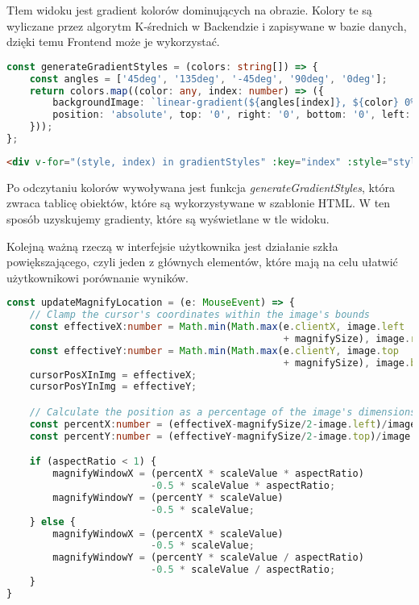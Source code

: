 Tłem widoku jest gradient kolorów dominujących na obrazie. Kolory te są wyliczane przez algorytm K-średnich w Backendzie i zapisywane w bazie danych, dzięki temu Frontend może je wykorzystać. 

\begin{lstlisting}[language=TypeScript, caption=Wyznaczanie gradientów z kolorów dominujących., label={lst:colors}]
const generateGradientStyles = (colors: string[]) => {
    const angles = ['45deg', '135deg', '-45deg', '90deg', '0deg'];
    return colors.map((color: any, index: number) => ({
        backgroundImage: `linear-gradient(${angles[index]}, ${color} 0%, transparent 100%)`,
        position: 'absolute', top: '0', right: '0', bottom: '0', left: '0',
    }));
};
\end{lstlisting}

\begin{lstlisting}[language=HTML, caption=Rysowanie kolorów dominujących (HTML).]
<div v-for="(style, index) in gradientStyles" :key="index" :style="style"/>
\end{lstlisting}

Po odczytaniu kolorów wywoływana jest funkcja \textit{generateGradientStyles}, która zwraca tablicę obiektów, które są wykorzystywane w szablonie HTML. W ten sposób uzyskujemy gradienty, które są wyświetlane w tle widoku.

Kolejną ważną rzeczą w interfejsie użytkownika jest działanie szkła powiększającego, czyli jeden z głównych elementów, które mają na celu ułatwić użytkownikowi porównanie wyników.

\begin{lstlisting}[language=TypeScript, caption=Implementacja szkła powiększającego (TypeScript)., label={lst:zoom}]
const updateMagnifyLocation = (e: MouseEvent) => {
    // Clamp the cursor's coordinates within the image's bounds
    const effectiveX:number = Math.min(Math.max(e.clientX, image.left   
                                                + magnifySize), image.right);
    const effectiveY:number = Math.min(Math.max(e.clientY, image.top    
                                                + magnifySize), image.bottom);
    cursorPosXInImg = effectiveX;
    cursorPosYInImg = effectiveY;

    // Calculate the position as a percentage of the image's dimensions
    const percentX:number = (effectiveX-magnifySize/2-image.left)/image.width;
    const percentY:number = (effectiveY-magnifySize/2-image.top)/image.height;

    if (aspectRatio < 1) {
        magnifyWindowX = (percentX * scaleValue * aspectRatio) 
                         -0.5 * scaleValue * aspectRatio;
        magnifyWindowY = (percentY * scaleValue) 
                         -0.5 * scaleValue;
    } else {
        magnifyWindowX = (percentX * scaleValue) 
                         -0.5 * scaleValue;
        magnifyWindowY = (percentY * scaleValue / aspectRatio) 
                         -0.5 * scaleValue / aspectRatio;
    }
}
\end{lstlisting}

